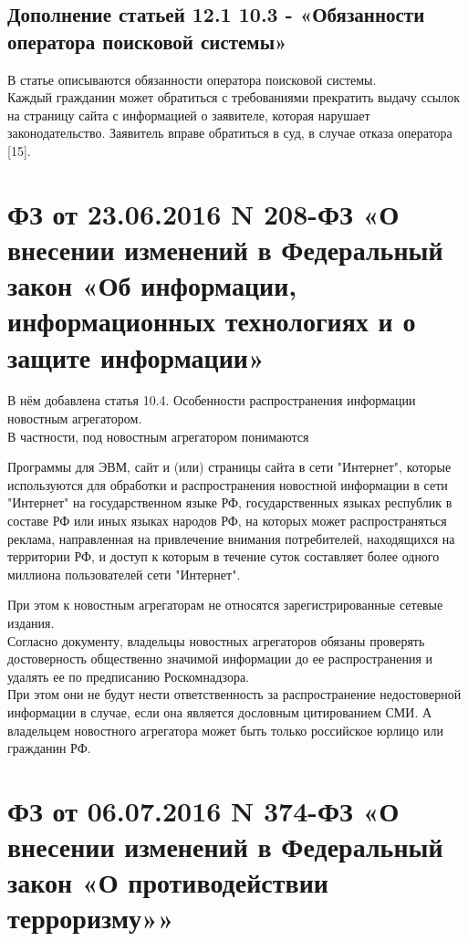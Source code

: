 \documentclass[14pt,a4paper,report]{article}
\begin{document}
\subsection{Дополнение статьей 12.1 10.3 - «Обязанности оператора поисковой системы»}

В статье описываются обязанности оператора поисковой системы. \\
Каждый гражданин может обратиться с требованиями прекратить выдачу ссылок на страницу сайта с информацией о заявителе, которая нарушает законодательство. Заявитель вправе обратиться в суд, в случае отказа оператора [15].


\section{ФЗ от 23.06.2016 N 208-ФЗ «О внесении изменений в Федеральный закон «Об информации, информационных технологиях и о защите информации»}

В нём добавлена статья 10.4. Особенности распространения информации новостным агрегатором.\\
В частности, под новостным агрегатором понимаются 
\begin{displayquote}
	Программы для ЭВМ, сайт и (или) страницы сайта в сети "Интернет", которые используются для обработки и распространения новостной информации в сети "Интернет" на государственном языке РФ, государственных языках республик в составе РФ или иных языках народов РФ, на которых может распространяться реклама, направленная на привлечение внимания потребителей, находящихся на территории РФ, и доступ к которым в течение суток составляет более одного миллиона пользователей сети "Интернет".
\end{displayquote}
При этом к новостным агрегаторам не относятся зарегистрированные сетевые издания.\\
Согласно документу, владельцы новостных агрегаторов обязаны проверять достоверность общественно значимой информации до ее распространения и удалять ее по предписанию Роскомнадзора.\\
При этом они не будут нести ответственность за распространение недостоверной информации в случае, если она является дословным цитированием СМИ. А владельцем новостного агрегатора может быть только российское юрлицо или гражданин РФ.

\section{ФЗ от 06.07.2016 N 374-ФЗ «О внесении изменений в Федеральный закон «О противодействии терроризму»»}
\end{document}
